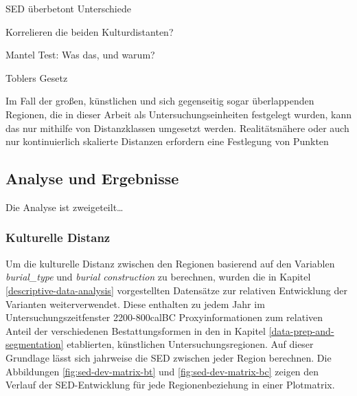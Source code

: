 \documentclass[openany,twoside,twocolumn]{book}
\begin{document}
SED überbetont Unterschiede

Korrelieren die beiden Kulturdistanten?

Mantel Test: Was das, und warum?

Toblers Gesetz

Im Fall der großen, künstlichen und sich gegenseitig sogar überlappenden
Regionen, die in dieser Arbeit als Untersuchungseinheiten festgelegt
wurden, kann das nur mithilfe von Distanzklassen umgesetzt werden.
Realitätsnähere oder auch nur kontinuierlich skalierte Distanzen
erfordern eine Festlegung von Punkten

\hypertarget{analyse-und-ergebnisse}{%
\subsection{Analyse und Ergebnisse}\label{analyse-und-ergebnisse}}

Die Analyse ist zweigeteilt\ldots{}

\hypertarget{kulturelle-distanz}{%
\subsubsection{Kulturelle Distanz}\label{kulturelle-distanz}}

Um die kulturelle Distanz zwischen den Regionen basierend auf den
Variablen \emph{burial\_type} und \emph{burial construction} zu
berechnen, wurden die in Kapitel \ref{descriptive-data-analysis}
vorgestellten Datensätze zur relativen Entwicklung der Varianten
weiterverwendet. Diese enthalten zu jedem Jahr im
Untersuchungszeitfenster 2200-800calBC Proxyinformationen zum relativen
Anteil der verschiedenen Bestattungsformen in den in Kapitel
\ref{data-prep-and-segmentation} etablierten, künstlichen
Untersuchungsregionen. Auf dieser Grundlage lässt sich jahrweise die SED
zwischen jeder Region berechnen. Die Abbildungen
\ref{fig:sed-dev-matrix-bt} und \ref{fig:sed-dev-matrix-bc} zeigen den
Verlauf der SED-Entwicklung für jede Regionenbeziehung in einer
Plotmatrix.
\end{document}
